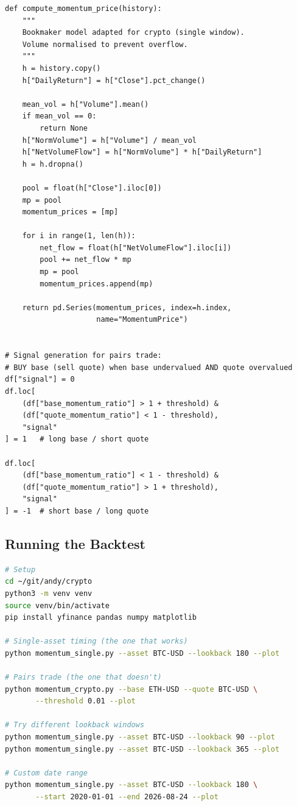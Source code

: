 \documentclass[11pt,a4paper]{article}
\begin{document}
\begin{codebox}
\begin{lstlisting}[style=python]
def compute_momentum_price(history):
    """
    Bookmaker model adapted for crypto (single window).
    Volume normalised to prevent overflow.
    """
    h = history.copy()
    h["DailyReturn"] = h["Close"].pct_change()

    mean_vol = h["Volume"].mean()
    if mean_vol == 0:
        return None
    h["NormVolume"] = h["Volume"] / mean_vol
    h["NetVolumeFlow"] = h["NormVolume"] * h["DailyReturn"]
    h = h.dropna()

    pool = float(h["Close"].iloc[0])
    mp = pool
    momentum_prices = [mp]

    for i in range(1, len(h)):
        net_flow = float(h["NetVolumeFlow"].iloc[i])
        pool += net_flow * mp
        mp = pool
        momentum_prices.append(mp)

    return pd.Series(momentum_prices, index=h.index,
                     name="MomentumPrice")


# Signal generation for pairs trade:
# BUY base (sell quote) when base undervalued AND quote overvalued
df["signal"] = 0
df.loc[
    (df["base_momentum_ratio"] > 1 + threshold) &
    (df["quote_momentum_ratio"] < 1 - threshold),
    "signal"
] = 1   # long base / short quote

df.loc[
    (df["base_momentum_ratio"] < 1 - threshold) &
    (df["quote_momentum_ratio"] > 1 + threshold),
    "signal"
] = -1  # short base / long quote
\end{lstlisting}
\end{codebox}

\subsection{Running the Backtest}

\begin{codebox}
\begin{lstlisting}[style=python,language=bash,keywordstyle=\color{codekw}]
# Setup
cd ~/git/andy/crypto
python3 -m venv venv
source venv/bin/activate
pip install yfinance pandas numpy matplotlib

# Single-asset timing (the one that works)
python momentum_single.py --asset BTC-USD --lookback 180 --plot

# Pairs trade (the one that doesn't)
python momentum_crypto.py --base ETH-USD --quote BTC-USD \
       --threshold 0.01 --plot

# Try different lookback windows
python momentum_single.py --asset BTC-USD --lookback 90 --plot
python momentum_single.py --asset BTC-USD --lookback 365 --plot

# Custom date range
python momentum_single.py --asset BTC-USD --lookback 180 \
       --start 2020-01-01 --end 2026-08-24 --plot
\end{lstlisting}
\end{codebox}
\end{document}

